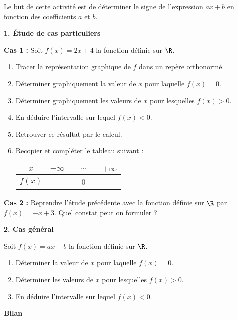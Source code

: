 
Le but de cette activité est de déterminer le signe de l'expression $ax + b$ en fonction des coefficients $a$ et $b$.

\begin{multicols}{2}
\textbf{1. Étude de cas particuliers}

\textbf{Cas 1 :} Soit $f(x)=2 x+4$ la fonction définie sur $\R$.
\begin{enumerate}
\item Tracer la représentation graphique de $f$ dans un repère orthonormé.
\item  Déterminer graphiquement la valeur de $x$ pour laquelle $f(x)=0$.
\item  Déterminer graphiquement les valeurs de $x$ pour lesquelles $f(x)>0$.
\item  En déduire l'intervalle sur lequel $f(x)<0$.
\item  Retrouver ce résultat par le calcul.
\item  Recopier et compléter le tableau suivant :
\begin{center}
\begin{tabular}{|c|p{1cm}ccc>{\raggedleft\arraybackslash}p{1cm}|}
\hline 
$x$ & $-\infty$ &  & $\cdots$  &  & $+\infty$ \\ 
\hline 
$f(x)$ &  &  & 0 &  &  \\ 
\hline 
\end{tabular} 
\end{center}

\end{enumerate}



\textbf{Cas 2 :}
Reprendre l'étude précédente avec la fonction définie sur $\R$ par $f(x)=-x+3$.
Quel constat peut on formuler ?


\vspace{0.4cm}

\textbf{2. Cas général}


Soit $f(x)=ax+b$ la fonction définie sur $\R$.
\begin{enumerate}
\item Déterminer la valeur de $x$ pour laquelle $f(x)=0$.
\item Déterminer les valeurs de $x$ pour lesquelles $f(x)>0$. 
\item En déduire l'intervalle sur lequel $f(x)<0$.
\end{enumerate}

\vspace{0.4cm}

\textbf{Bilan}


\end{multicols}
